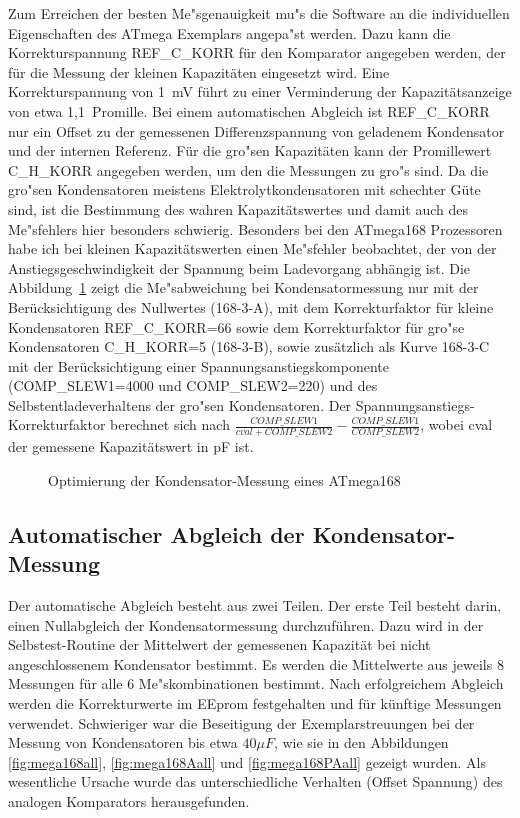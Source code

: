Zum Erreichen der besten Me"sgenauigkeit mu"s die Software an die individuellen Eigenschaften des ATmega Exemplars
angepa"st werden. Dazu kann die Korrekturspannung REF\_C\_KORR f\"ur den Komparator angegeben werden, der f\"ur die Messung der kleinen 
Kapazit\"aten eingesetzt wird. Eine Korrekturspannung von 1~mV f\"uhrt zu einer Verminderung der Kapazit\"atsanzeige von etwa 1,1~Promille.
Bei einem automatischen Abgleich ist REF\_C\_KORR  nur ein Offset zu der gemessenen Differenzspannung von geladenem Kondensator
und der internen Referenz.
F\"ur die gro"sen Kapazit\"aten kann der Promillewert C\_H\_KORR angegeben werden, um den die Messungen
zu gro"s sind.
Da die gro"sen Kondensatoren meistens Elektrolytkondensatoren mit schechter G\"ute sind, ist die Bestimmung
des wahren Kapazit\"atswertes und damit auch des Me"sfehlers hier besonders schwierig.
Besonders bei den ATmega168 Prozessoren habe ich bei kleinen Kapazit\"atswerten einen Me"sfehler beobachtet, 
der von der Anstiegsgeschwindigkeit der Spannung beim Ladevorgang abh\"angig ist.
Die Abbildung~\ref{fig:mega168optcap} zeigt die Me"sabweichung bei Kondensatormessung nur mit der Ber\"ucksichtigung des
Nullwertes (168-3-A), mit dem Korrekturfaktor f\"ur kleine Kondensatoren REF\_C\_KORR=66 sowie dem Korrekturfaktor f\"ur gro"se
Kondensatoren C\_H\_KORR=5 (168-3-B), sowie zus\"atzlich als Kurve 168-3-C  mit der Ber\"ucksichtigung einer Spannungsanstiegskomponente 
(COMP\_SLEW1=4000 und COMP\_SLEW2=220) und des Selbstentladeverhaltens der gro"sen Kondensatoren.
Der Spannungsanstiegs-Korrekturfaktor berechnet sich nach \(\frac{COMP\_SLEW1}{cval+COMP\_SLEW2} - \frac{COMP\_SLEW1}{COMP\_SLEW2}\),
wobei cval der gemessene Kapazit\"atswert in pF ist.

\begin{figure}[H]
\centering

\caption{Optimierung der Kondensator-Messung eines ATmega168}
\label{fig:mega168optcap}
\end{figure}

\subsection{Automatischer Abgleich der Kondensator-Messung}

Der automatische Abgleich besteht aus zwei Teilen. Der erste Teil besteht darin, einen Nullabgleich der Kondensatormessung durchzuf\"uhren.
Dazu wird in der Selbstest-Routine der Mittelwert der gemessenen Kapazit\"at bei nicht angeschlossenem Kondensator bestimmt.
Es werden die Mittelwerte aus jeweils 8 Messungen f\"ur alle 6 Me"skombinationen bestimmt.
Nach erfolgreichem Abgleich werden die Korrekturwerte im EEprom festgehalten und f\"ur k\"unftige Messungen verwendet.
Schwieriger war die Beseitigung der Exemplarstreuungen bei der Messung von Kondensatoren bis etwa \(40 \mu F\), wie sie in den 
Abbildungen \ref{fig:mega168all}, \ref{fig:mega168Aall} und \ref{fig:mega168PAall} gezeigt wurden.
Als wesentliche Ursache wurde das unterschiedliche Verhalten (Offset Spannung) des analogen Komparators herausgefunden.

